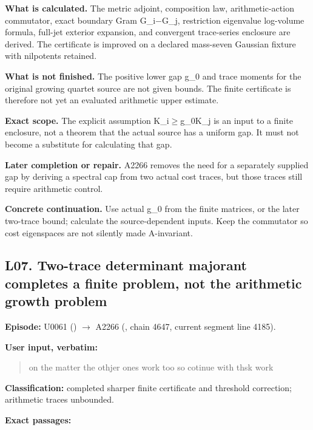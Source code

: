 \documentclass[10pt,a4paper,oneside]{report}
\begin{document}
\textbf{What is calculated.} The metric adjoint, composition law,
arithmetic-action commutator, exact boundary Gram
G\_i\allowbreak{}\ensuremath{−}\allowbreak{}G\_j, restriction eigenvalue
log-volume formula, full-jet exterior expansion, and convergent
trace-series enclosure are derived. The certificate is improved on a
declared mass-seven Gaussian fixture with nilpotents retained.

\textbf{What is not finished.} The positive lower gap g\_0 and trace
moments for the original growing quartet source are not given bounds.
The finite certificate is therefore not yet an evaluated arithmetic
upper estimate.

\textbf{Exact scope.} The explicit assumption
K\_i\allowbreak{}\ensuremath{≥}\allowbreak{}g\_0K\_j is an input to a
finite enclosure, not a theorem that the actual source has a uniform
gap. It must not become a substitute for calculating that gap.

\textbf{Later completion or repair.} A2266 removes the need for a
separately supplied gap by deriving a spectral cap from two actual cost
traces, but those traces still require arithmetic control.

\textbf{Concrete continuation.} Use actual g\_0 from the finite
matrices, or the later two-trace bound; calculate the source-dependent
inputs. Keep the commutator so cost eigenspaces are not silently made
A-invariant.

\subsection{L07. Two-trace determinant majorant completes a finite
problem, not the arithmetic growth
problem}\label{l07.-two-trace-determinant-majorant-completes-a-finite-problem-not-the-arithmetic-growth-problem}

\textbf{Episode:} U0061
(\protect{})
\allowbreak{}\ensuremath{→}\allowbreak{} A2266
(\protect{}, chain 4647,
current segment line 4185).

\textbf{User input, verbatim:}

\begin{quote}
on the matter the othjer ones work too so cotinue with thsk work
\end{quote}

\textbf{Classification:} completed sharper finite certificate and
threshold correction; arithmetic traces unbounded.

\textbf{Exact passages:}
\end{document}
